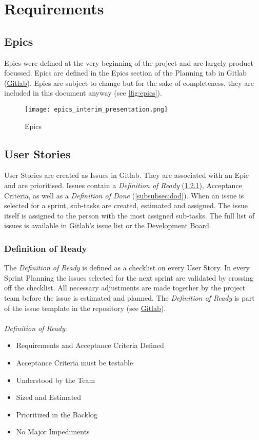 \section{Requirements}
\subsection{Epics}
Epics were defined at the very beginning of the project and are largely product focussed.
Epics are defined in the Epics section of the Planning tab in Gitlab (\href{https://gitlab.ti.bfh.ch/groups/decibel-threshold-event-displayer/-/epics}{Gitlab}). Epics are subject to change
but for the sake of completeness, they are included in this document anyway (see \autoref{fig:epics}).
\begin{figure}[H]
    \centering
    \texttt{[image: epics\_interim\_presentation.png]}
    \caption{Epics}\label{fig:epics}
\end{figure}
\subsection{User Stories}
User Stories are created as Issues in Gitlab. They are associated with an Epic and are prioritised. Issues contain a \textit{Definition of Ready} (\ref{subsubsec:dor}), Acceptance Criteria, as well as a \textit{Definition of Done} (\ref{subsubsec:dod}).
When an issue is selected for a sprint, sub-tasks are created, estimated and assigned. The issue itself is assigned to the person with the most assigned sub-tasks. The full list of issues is available in \href{https://gitlab.ti.bfh.ch/groups/decibel-threshold-event-displayer/-/issues}{Gitlab's issue list} or the \href{https://gitlab.ti.bfh.ch/decibel-threshold-event-displayer/decibel-threshold-event-displayer/-/boards/2832}{Development Board}.

\subsubsection{Definition of Ready}\label{subsubsec:dor}
The \textit{Definition of Ready} is defined as a checklist on every User Story. In every Sprint Planning the issues selected for
the next sprint are validated by crossing off the checklist. All necessary adjustments are made together by the project team before the issue is
estimated and planned. The \textit{Definition of Ready} is part of the issue template in the repository
(see \href{https://gitlab.ti.bfh.ch/decibel-threshold-event-displayer/decibel-threshold-event-displayer/-/blob/main/.gitlab/issue_templates/User\%20Story.md}{Gitlab}). \\ \\
\textit{Definition of Ready}:
\begin{itemize}
    \item Requirements and Acceptance Criteria Defined
    \item Acceptance Criteria must be testable
    \item Understood by the Team
    \item Sized and Estimated
    \item Prioritized in the Backlog
    \item No Major Impediments
\end{itemize}

